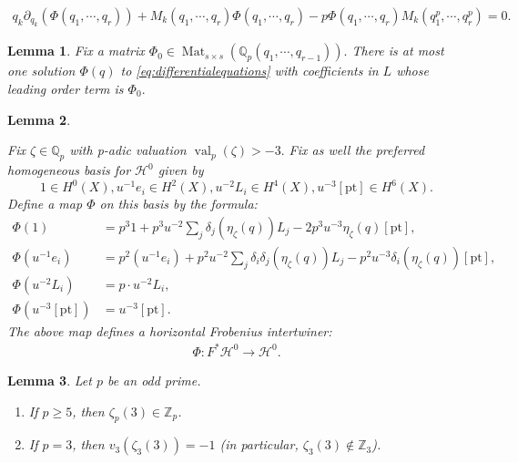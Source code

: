 \documentclass[10pt,a4paper]{amsart}
\newtheorem{lemma}{Lemma}
\newcommand{\calH}{\mathcal{H}}
\begin{document}
\begin{align} \label{eq:differentialequations} q_k\partial_{q_k}(\Phi(q_1, \cdots, q_r)) + M_k(q_1, \cdots, q_r)\Phi(q_1, \cdots, q_r)-p\Phi(q_1, \cdots, q_r)M_k(q_1^p, \cdots, q_r^p)=0. \end{align}

\begin{lemma} \label{lem:initialtermdeterminesFrob} Fix a matrix $\Phi_0 \in \operatorname{Mat}_{s\times s}(\mathbb{Q}_p(q_1,\cdots,q_{r-1})).$ There is at most one solution $\Phi(q)$ to  \eqref{eq:differentialequations} with coefficients in $L$ whose leading order term is $\Phi_0.$ \end{lemma}

\begin{lemma} \label{lem:integralityusingKSV} 

Fix $\zeta \in \mathbb{Q}_p$ with p-adic valuation $\operatorname{val}_p(\zeta)>-3.$ Fix as well the preferred homogeneous basis for $\calH^0$ given by $$1 \in H^0(X), u^{-1} e_i \in H^2(X), u^{-2}L_i \in H^4(X), u^{-3}[\mathrm{pt}] \in H^6(X).$$  Define a map $\Phi$ on this basis by the formula: 
\begin{align}
\Phi (1) &= p^3 1 +p^3 u^{-2} \sum_j\delta_j(\eta_\zeta (q)) L_j -2p^3 u^{-3} \eta_\zeta (q) [\mathrm{pt}], \\
\Phi (u^{-1}e_i) &= p^2 (u^{-1}e_i) + p^2 u^{-2}  \sum_j \delta_{i}\delta_{j}(\eta_\zeta(q))L_j -p^2 u^{-3}\delta_i(\eta_\zeta (q)) [\mathrm{pt}],\nonumber \\
\Phi (u^{-2}L_i) &= p \cdot u^{-2}L_i, \\
\Phi (u^{-3}[\mathrm{pt}])&=u^{-3}[\mathrm{pt}]. \nonumber  
\end{align}
The above map defines a horizontal Frobenius intertwiner: 
\begin{align}\label{eq:PhiH0} \Phi :  F^*\calH^0 \to \calH^0.\end{align} \end{lemma} 

\begin{lemma}\label{lem:pintegrality}
Let $p$ be an odd prime.
\begin{enumerate}
    \item[(a)] If $p \ge 5$, then $\zeta_p(3) \in \mathbb{Z}_p$.
    \item[(b)] If $p = 3$, then $v_3(\zeta_3(3)) = -1$ (in particular, $\zeta_3(3) \notin \mathbb{Z}_3$).
\end{enumerate}
\end{lemma}
\end{document}
